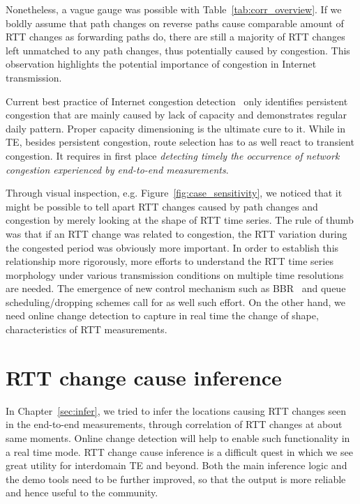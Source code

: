 Nonetheless, a vague gauge was possible with Table~\ref{tab:corr_overview}.
If we boldly assume that path changes on reverse paths cause comparable amount of RTT changes as forwarding paths do, there are still a majority of RTT changes left unmatched to any path changes, thus potentially caused by congestion. 
This observation highlights the potential importance of congestion in Internet transmission.

Current best practice of Internet congestion detection~\cite{Luckie2014} only identifies persistent congestion that are mainly caused by lack of capacity and demonstrates regular daily pattern. 
Proper capacity dimensioning is the ultimate cure to it. 
While in TE, besides persistent congestion, route selection has to as well react to transient congestion.
It requires in first place \textit{detecting timely the occurrence of network congestion experienced by end-to-end measurements}.

Through visual inspection, e.g. Figure~\ref{fig:case_sensitivity}, we noticed that it might be possible to tell apart RTT changes caused by path changes and congestion by merely looking at the shape of RTT time series. The rule of thumb was that if an RTT change was related to congestion, the RTT variation during the congested period was obviously more important. 
In order to establish this relationship more rigorously, more efforts to understand the RTT time series morphology under various transmission conditions on multiple time resolutions are needed.
The emergence of new control mechanism such as BBR~\cite{Cardwell2016, quic_cc} and queue scheduling/dropping schemes call for as well such effort.
On the other hand, we need online change detection to capture in real time the change of shape, characteristics of RTT measurements.


\section{RTT change cause inference}
In Chapter~\ref{sec:infer}, we tried to infer the locations causing RTT changes seen in the end-to-end measurements, through correlation of RTT changes at about  same moments.
Online change detection will help to enable such functionality in a real time mode.
RTT change cause inference is a difficult quest in which we see great utility for interdomain TE and beyond. 
Both the main inference logic and the demo tools need to be further improved, so that the output is more reliable and hence useful to the community.

